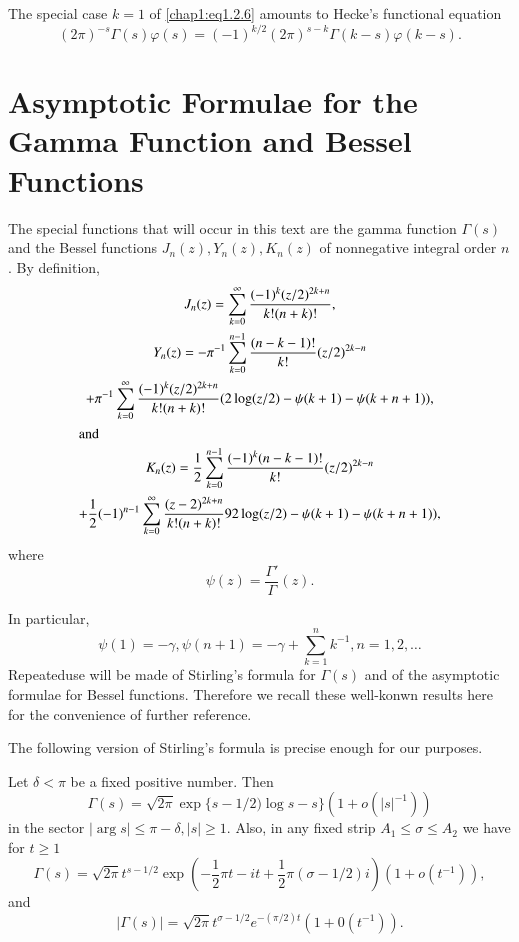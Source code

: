 \begin{REM*}
The special case $k=1$ of \eqref{chap1:eq1.2.6} amounts to Hecke's
functional equation
$$
(2\pi)^{-s}\Gamma(s)\varphi(s)=(-1)^{k/2}(2\pi)^{s-k}
\Gamma(k-s)\varphi(k-s).
$$
\end{REM*}

\section[Aysmptotic Formula]{Asymptotic Formulae for the Gamma
Function and Bessel Functions}\label{chap1:sec1.3}

The special functions that will occur in this text are the gamma
function $\Gamma(s)$ and the Bessel functions $J_n(z),Y_n(z),K_n(z)$
of nonnegative integral order $n$. By definition,
\begin{gather}
J_n(z) = \sum\limits_{k=0}^\infty \frac{(-1)^k(z/2)^{2k+n}}
{k!(n+k)!},\label{chap1:eq1.3.1}\\
Y_n(z)= -\pi^{-1}\sum\limits_{k=0}^{n-1} \frac{(n-k-1)!}{k!}
(z/2)^{2k-n}\label{chap1:eq1.3.2}\\
+\pi^{-1}\sum\limits_{k=0}^\infty \frac{(-1)^k(z/2)^{2k+n}} {k!(n+k)!}
(2\log(z/2)-\psi(k+1)-\psi(k+n+1)),\notag\\
\intertext{and}
K_n(z)=\frac{1}{2}\sum\limits_{k=0}^{n-1} \frac{(-1)^k(n-k-1)!}{k!}
(z/2)^{2k-n}\label{chap1:eq1.3.3}\\
+\frac{1}{2}(-1)^{n-1}\sum\limits_{k=0}^\infty \frac{(z-2)^{2k+n}}
{k!(n+k)!} 92\log(z/2)-\psi(k+1)-\psi(k+n+1)),\notag
\end{gather}
where
$$
\psi(z)=\frac{\Gamma'}{\Gamma}(z).
$$

In particular,
$$
\psi(1)= -\gamma,\psi(n+1)= -\gamma +\sum\limits_{k=1}^nk^{-1},
n=1,2,\ldots 
$$
Repeated\pageoriginale use will be made of Stirling's formula for
$\Gamma(s)$ and of the asymptotic formulae for Bessel
functions. Therefore we recall these well-konwn results here for the
convenience of further reference.

The following version of Stirling's formula is precise enough for our
purposes.
\begin{lem}\label{chap1:lem1.3}
Let $\delta < \pi$ be a fixed positive number. Then
\begin{equation}\label{chap1:eq1.3.4}
\Gamma(s)=\sqrt{2\pi}\exp\{s-1/2)\log s-s\}(1+o(|s|^{-1}))
\end{equation}
in the sector $|\arg s|\leq\pi-\delta,|s|\geq 1$. Also, in any fixed
strip $A_1\leq \sigma \leq A_2$ we have for $t\geq 1$
\begin{equation}\label{chap1:eq1.3.5}
\Gamma(s)=\sqrt{2\pi} t^{s-1/2}\exp(-\frac{1}{2}\pi t-it+ \frac{1}{2}
\pi(\sigma -1/2)i)(1+o(t^{-1})),
\end{equation}
and
\begin{equation}\label{chap1:eq1.3.6}
|\Gamma(s)|=\sqrt{2\pi} t^{\sigma -1/2} e^{-(\pi/2)t}(1+0(t^{-1})).
\end{equation}
\end{lem}

